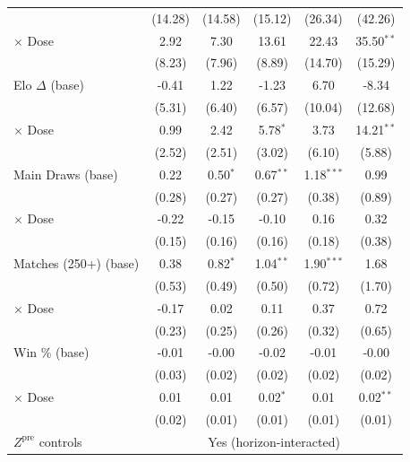 \begin{tabular}{lccccc}
 & (14.28) & (14.58) & (15.12) & (26.34) & (42.26) \\
\quad \quad $\times$ Dose & 2.92 & 7.30 & 13.61 & 22.43 & 35.50$^{**}$ \\
 & (8.23) & (7.96) & (8.89) & (14.70) & (15.29) \\[0.3em]
\quad Elo $\Delta$ (base) & -0.41 & 1.22 & -1.23 & 6.70 & -8.34 \\
 & (5.31) & (6.40) & (6.57) & (10.04) & (12.68) \\
\quad \quad $\times$ Dose & 0.99 & 2.42 & 5.78$^{*}$ & 3.73 & 14.21$^{**}$ \\
 & (2.52) & (2.51) & (3.02) & (6.10) & (5.88) \\[0.3em]
\quad Main Draws (base) & 0.22 & 0.50$^{*}$ & 0.67$^{**}$ & 1.18$^{***}$ & 0.99 \\
 & (0.28) & (0.27) & (0.27) & (0.38) & (0.89) \\
\quad \quad $\times$ Dose & -0.22 & -0.15 & -0.10 & 0.16 & 0.32 \\
 & (0.15) & (0.16) & (0.16) & (0.18) & (0.38) \\[0.3em]
\quad Matches (250+) (base) & 0.38 & 0.82$^{*}$ & 1.04$^{**}$ & 1.90$^{***}$ & 1.68 \\
 & (0.53) & (0.49) & (0.50) & (0.72) & (1.70) \\
\quad \quad $\times$ Dose & -0.17 & 0.02 & 0.11 & 0.37 & 0.72 \\
 & (0.23) & (0.25) & (0.26) & (0.32) & (0.65) \\[0.3em]
\quad Win \% (base) & -0.01 & -0.00 & -0.02 & -0.01 & -0.00 \\
 & (0.03) & (0.02) & (0.02) & (0.02) & (0.02) \\
\quad \quad $\times$ Dose & 0.01 & 0.01 & 0.02$^{*}$ & 0.01 & 0.02$^{**}$ \\
 & (0.02) & (0.01) & (0.01) & (0.01) & (0.01) \\[0.3em]
\midrule
$Z^{\text{pre}}$ controls & \multicolumn{5}{c}{Yes (horizon-interacted)} \\
\bottomrule
\end{tabular}
